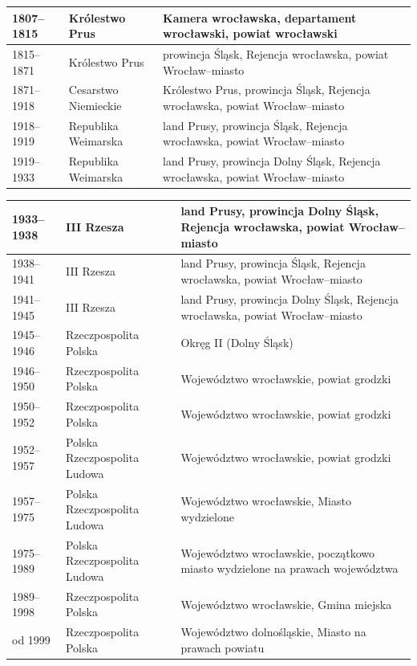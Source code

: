 \documentclass{article}
\begin{document}
\begin{tabular}{ |p{2cm}|p{5cm}|p{5cm}| }
\hline
1807–1815 & Królestwo Prus & Kamera wrocławska, departament wrocławski, powiat wrocławski\\
\hline
1815–1871 & Królestwo Prus & prowincja Śląsk, Rejencja wrocławska, powiat Wrocław–miasto\\
\hline 
1871–1918 & Cesarstwo Niemieckie & Królestwo Prus, prowincja Śląsk, Rejencja wrocławska, powiat Wrocław–miasto\\
\hline
1918–1919 & Republika Weimarska & land Prusy, prowincja Śląsk, Rejencja wrocławska, powiat Wrocław–miasto\\
\hline 
1919–1933 & Republika Weimarska & land Prusy, prowincja Dolny Śląsk, Rejencja wrocławska, powiat Wrocław–miasto\\
\hline
\end{tabular}
\begin{tabular}{ |p{2cm}|p{5cm}|p{5cm}| }
 \hline
1933–1938 & III Rzesza & land Prusy, prowincja Dolny Śląsk, Rejencja wrocławska, powiat Wrocław–miasto\\
\hline
1938–1941 & III Rzesza & land Prusy, prowincja Śląsk, Rejencja wrocławska, powiat Wrocław–miasto\\
\hline
1941–1945 & III Rzesza & land Prusy, prowincja Dolny Śląsk, Rejencja wrocławska, powiat Wrocław–miasto\\
\hline
1945–1946 & Rzeczpospolita Polska & Okręg II (Dolny Śląsk)\\
\hline
1946–1950 & Rzeczpospolita Polska & Województwo wrocławskie, powiat grodzki\\
\hline
1950–1952 & Rzeczpospolita Polska & Województwo wrocławskie, powiat grodzki\\
\hline
1952–1957 & Polska Rzeczpospolita Ludowa & Województwo wrocławskie, powiat grodzki\\
\hline
1957–1975 & Polska Rzeczpospolita Ludowa & Województwo wrocławskie, Miasto wydzielone\\
\hline
1975–1989 & Polska Rzeczpospolita Ludowa & Województwo wrocławskie, początkowo miasto wydzielone na prawach województwa\\
\hline
1989–1998 & Rzeczpospolita Polska & Województwo wrocławskie, Gmina miejska\\
\hline
od 1999 & Rzeczpospolita Polska & Województwo dolnośląskie, Miasto na prawach powiatu\\





 \hline
\end{tabular}\\\\
\end{document}
